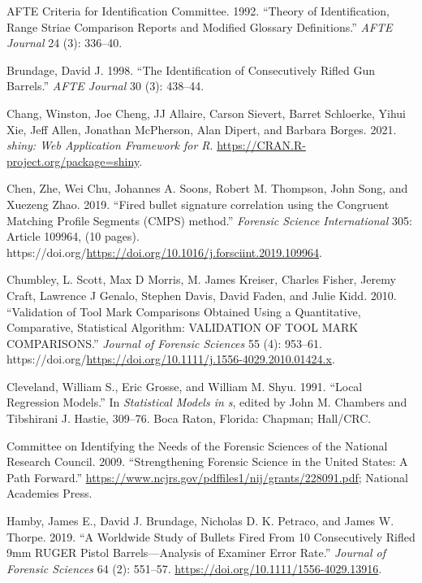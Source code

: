 \hypertarget{refs}{}
\begin{CSLReferences}{1}{0}
\leavevmode{}%
AFTE Criteria for Identification Committee. 1992. {``Theory of Identification, Range Striae Comparison Reports and Modified Glossary Definitions.''} \emph{AFTE Journal} 24 (3): 336--40.

\leavevmode{}%
Brundage, David J. 1998. {``{The Identification of Consecutively Rifled Gun Barrels}.''} \emph{AFTE Journal} 30 (3): 438--44.

\leavevmode{}%
Chang, Winston, Joe Cheng, JJ Allaire, Carson Sievert, Barret Schloerke, Yihui Xie, Jeff Allen, Jonathan McPherson, Alan Dipert, and Barbara Borges. 2021. \emph{{shiny: Web Application Framework for R}}. \url{https://CRAN.R-project.org/package=shiny}.

\leavevmode{}%
Chen, Zhe, Wei Chu, Johannes A. Soons, Robert M. Thompson, John Song, and Xuezeng Zhao. 2019. {``{Fired bullet signature correlation using the Congruent Matching Profile Segments (CMPS) method}.''} \emph{Forensic Science International} 305: Article 109964, (10 pages). https://doi.org/\url{https://doi.org/10.1016/j.forsciint.2019.109964}.

\leavevmode{}%
Chumbley, L. Scott, Max D Morris, M. James Kreiser, Charles Fisher, Jeremy Craft, Lawrence J Genalo, Stephen Davis, David Faden, and Julie Kidd. 2010. {``Validation of Tool Mark Comparisons Obtained Using a Quantitative, Comparative, Statistical Algorithm: VALIDATION OF TOOL MARK COMPARISONS.''} \emph{Journal of Forensic Sciences} 55 (4): 953--61. https://doi.org/\url{https://doi.org/10.1111/j.1556-4029.2010.01424.x}.

\leavevmode{}%
Cleveland, William S., Eric Grosse, and William M. Shyu. 1991. {``Local Regression Models.''} In \emph{Statistical Models in s}, edited by John M. Chambers and Tibshirani J. Hastie, 309--76. Boca Raton, Florida: Chapman; Hall/CRC.

\leavevmode{}%
Committee on Identifying the Needs of the Forensic Sciences of the National Research Council. 2009. {``{Strengthening Forensic Science in the United States: A Path Forward}.''} \url{https://www.ncjrs.gov/pdffiles1/nij/grants/228091.pdf}; National Academies Press.

\leavevmode{}%
Hamby, James E., David J. Brundage, Nicholas D. K. Petraco, and James W. Thorpe. 2019. {``A {Worldwide} {Study} of {Bullets} {Fired} {From} 10 {Consecutively} {Rifled} {9mm} {RUGER} {Pistol} {Barrels}---{Analysis} of {Examiner} {Error} {Rate}.''} \emph{Journal of Forensic Sciences} 64 (2): 551--57. \url{https://doi.org/10.1111/1556-4029.13916}.


\end{CSLReferences}
